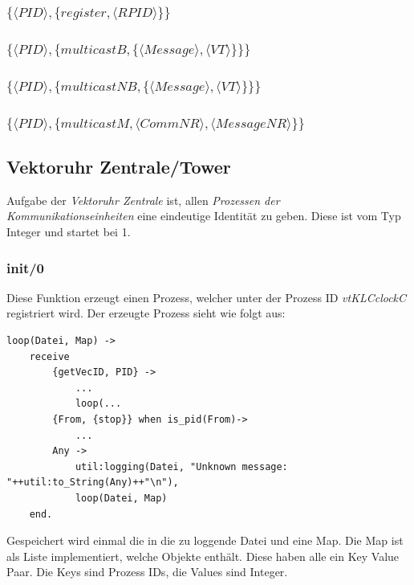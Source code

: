 \subsubsection{$\{\langle PID \rangle,\{register,\langle RPID\rangle\}\}$}

\subsubsection{$\{\langle PID\rangle,\{multicastB,\{\langle Message\rangle,\langle VT\rangle\}\}\}$}

\subsubsection{$\{\langle PID\rangle,\{multicastNB,\{\langle Message\rangle,\langle VT\rangle\}\}\}$}

\subsubsection{$\{\langle PID\rangle,\{multicastM,\langle CommNR\rangle,\langle MessageNR\rangle\}\}$}


\subsection{Vektoruhr Zentrale/Tower}

Aufgabe der \textit{Vektoruhr Zentrale} ist, allen \textit{Prozessen der Kommunikationseinheiten} eine eindeutige Identität zu geben. Diese ist vom Typ Integer und startet bei 1.

\subsubsection{init/0}

Diese Funktion erzeugt einen Prozess, welcher unter der Prozess ID \textit{vtKLCclockC} registriert wird. Der erzeugte Prozess sieht wie folgt aus:

\begin{lstlisting}
loop(Datei, Map) ->
    receive
        {getVecID, PID} ->
            ...
            loop(...
        {From, {stop}} when is_pid(From)->
            ...
        Any -> 
            util:logging(Datei, "Unknown message: "++util:to_String(Any)++"\n"),
            loop(Datei, Map)
    end.
\end{lstlisting}

Gespeichert wird einmal die in die zu loggende Datei und eine Map. Die Map ist als Liste implementiert, welche Objekte enthält. Diese haben alle ein Key Value Paar. Die Keys sind Prozess IDs, die Values sind Integer.

